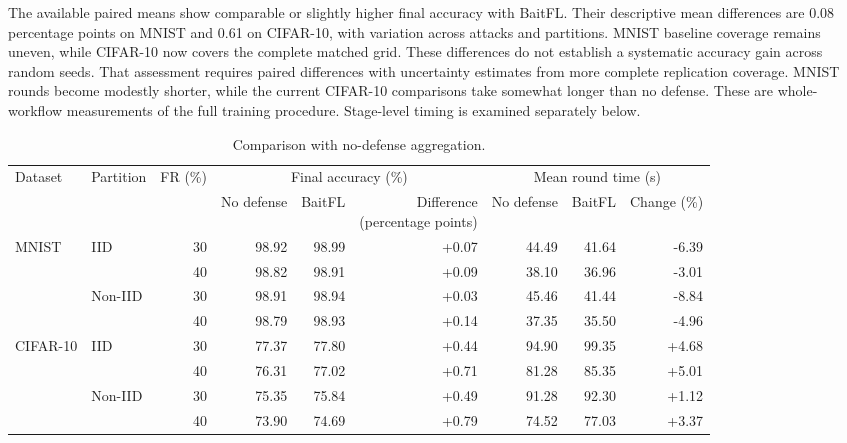 \documentclass[journal]{IEEEtran}
\begin{document}
The available paired means show comparable or slightly higher final
accuracy with BaitFL. Their descriptive mean differences are
0.08 percentage points on MNIST and 0.61
on CIFAR-10, with variation across attacks and partitions. MNIST baseline
coverage remains uneven, while CIFAR-10 now covers the complete matched
grid. These differences do not establish a systematic accuracy gain
across random seeds. That assessment requires paired differences with
uncertainty estimates from more complete replication coverage.
MNIST rounds become modestly shorter, while the current CIFAR-10
comparisons take somewhat longer than no defense. These are whole-workflow
measurements of the full training procedure. Stage-level timing is
examined separately below.

\begin{table}[t]\centering\footnotesize\setlength{\tabcolsep}{5pt}
\caption{Comparison with no-defense aggregation.}\label{tab:baseline}
\begin{tabular}{llrrrrrrr}\toprule
\multirow{2}{*}{Dataset} & \multirow{2}{*}{Partition} & \multirow{2}{*}{FR (\%)} & \multicolumn{3}{c}{Final accuracy (\%)} & \multicolumn{3}{c}{Mean round time (s)} \\
\cmidrule(lr){4-6}\cmidrule(lr){7-9}
& & & No defense & BaitFL & \shortstack{Difference\\(percentage points)} & No defense & BaitFL & Change (\%) \\ \midrule
\multirow{4}{*}{MNIST} & \multirow{2}{*}{IID} & 30 & 98.92 & 98.99 & +0.07 & 44.49 & 41.64 & -6.39 \\
 &  & 40 & 98.82 & 98.91 & +0.09 & 38.10 & 36.96 & -3.01 \\
\cmidrule(lr){2-9}
 & \multirow{2}{*}{Non-IID} & 30 & 98.91 & 98.94 & +0.03 & 45.46 & 41.44 & -8.84 \\
 &  & 40 & 98.79 & 98.93 & +0.14 & 37.35 & 35.50 & -4.96 \\
\midrule
\multirow{4}{*}{CIFAR-10} & \multirow{2}{*}{IID} & 30 & 77.37 & 77.80 & +0.44 & 94.90 & 99.35 & +4.68 \\
 &  & 40 & 76.31 & 77.02 & +0.71 & 81.28 & 85.35 & +5.01 \\
\cmidrule(lr){2-9}
 & \multirow{2}{*}{Non-IID} & 30 & 75.35 & 75.84 & +0.49 & 91.28 & 92.30 & +1.12 \\
 &  & 40 & 73.90 & 74.69 & +0.79 & 74.52 & 77.03 & +3.37 \\
\bottomrule\end{tabular}\end{table}
\end{document}
